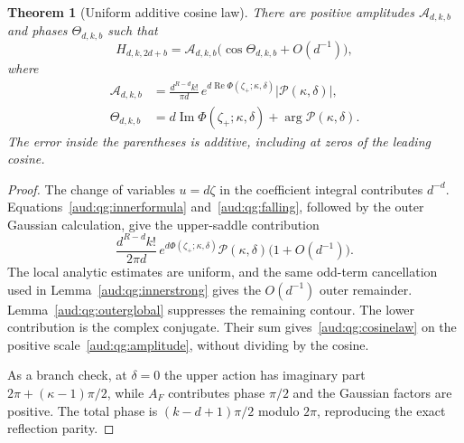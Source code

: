 \documentclass[11pt,a4paper]{article}
\numberwithin{equation}{section}
\newtheorem{theorem}{Theorem}[section]
\begin{document}
\begin{theorem}[Uniform additive cosine law]\label{aud:qg:cosine}
There are positive amplitudes $\mathcal A_{d,k,b}$ and phases $\Theta_{d,k,b}$ such that
\begin{equation}\label{aud:qg:cosinelaw}
 H_{d,k,2d+b}=\mathcal A_{d,k,b}
 \bigl(\cos\Theta_{d,k,b}+O(d^{-1})\bigr),
\end{equation}
where
\begin{align}
 \mathcal A_{d,k,b}
 &=\frac{d^{R-d}k!}{\pi d}\,
 e^{d\operatorname{Re}\Phi(\zeta_+;\kappa,\delta)}
 |\mathcal P(\kappa,\delta)|,\label{aud:qg:amplitude}\\
 \Theta_{d,k,b}
 &=d\operatorname{Im}\Phi(\zeta_+;\kappa,\delta)
   +\arg\mathcal P(\kappa,\delta).
 \label{aud:qg:Theta}
\end{align}
The error inside the parentheses is additive, including at zeros of the leading cosine.
\end{theorem}
\begin{proof}
The change of variables $u=d\zeta$ in the coefficient integral contributes $d^{-d}$. Equations~\eqref{aud:qg:innerformula} and~\eqref{aud:qg:falling}, followed by the outer Gaussian calculation, give the upper-saddle contribution
\[
 \frac{d^{R-d}k!}{2\pi d}\,
 e^{d\Phi(\zeta_+;\kappa,\delta)}\mathcal P(\kappa,\delta)
 \bigl(1+O(d^{-1})\bigr).
\]
The local analytic estimates are uniform, and the same odd-term cancellation used in Lemma~\ref{aud:qg:innerstrong} gives the $O(d^{-1})$ outer remainder. Lemma~\ref{aud:qg:outerglobal} suppresses the remaining contour. The lower contribution is the complex conjugate. Their sum gives~\eqref{aud:qg:cosinelaw} on the positive scale~\eqref{aud:qg:amplitude}, without dividing by the cosine.

As a branch check, at $\delta=0$ the upper action has imaginary part $2\pi+(\kappa-1)\pi/2$, while $A_F$ contributes phase $\pi/2$ and the Gaussian factors are positive. The total phase is $(k-d+1)\pi/2$ modulo $2\pi$, reproducing the exact reflection parity.
\end{proof}
\end{document}
